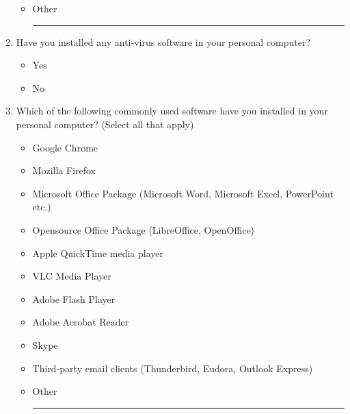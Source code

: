 \documentclass[doctor]{thesis} %
\theoremstyle{plain}
\begin{document}
\begin{enumerate}[topsep=-4em]
\begin{itemize}[topsep=-6em, label={o}]
\item Other \rule{4cm}{0.4pt}
\end{itemize}
\item Have you installed any anti-virus software in your personal computer?
\begin{itemize}[topsep=-6em, label={o}]
\itemsep-1em 
\item Yes
\item No
\end{itemize}
\item Which of the following commonly used software have you installed in your personal computer? (Select all that apply)
\begin{itemize}[topsep=-6em, label={o}]
\itemsep-1em 
\item Google Chrome
\item Mozilla Firefox
\item Microsoft Office Package (Microsoft Word, Microsoft Excel, PowerPoint etc.)
\item Opensource Office Package (LibreOffice, OpenOffice)
\item Apple QuickTime media player
\item VLC Media Player
\item Adobe Flash Player
\item Adobe Acrobat Reader
\item Skype
\item Third-party email clients (Thunderbird, Eudora, Outlook Express)
\item Other \rule{4cm}{0.4pt}
\end{itemize}
\end{enumerate}
\end{document}

